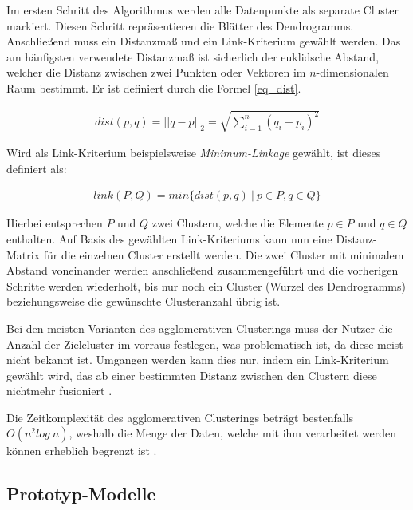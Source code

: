 Im ersten Schritt des Algorithmus werden alle Datenpunkte als separate Cluster markiert. Diesen Schritt
repräsentieren die Blätter des Dendrogramms.
Anschließend muss ein Distanzmaß und ein Link-Kriterium gewählt werden.
Das am häufigsten verwendete Distanzmaß ist sicherlich der euklidsche Abstand, welcher die Distanz zwischen zwei Punkten
oder Vektoren im $n$-dimensionalen Raum bestimmt. Er ist definiert durch die Formel \ref{eq_dist}.

\begin{ceqn}
\begin{align}
\label{eq_dist}
    dist(p,q) = ||q-p||_2 = \sqrt{\sum_{i=1}^n (q_i-p_i)^2}
\end{align}
\end{ceqn}

Wird als Link-Kriterium beispielsweise \textit{Minimum-Linkage} gewählt, ist dieses definiert als:

\begin{ceqn}
\begin{align}
\label{eq_linkage}
    link(P, Q) = min\{ dist(p,q)\ |\ p \in P, q \in Q\}
\end{align}
\end{ceqn}

Hierbei entsprechen $P$ und $Q$ zwei Clustern, welche die Elemente $p \in P$ und $q \in Q$ enthalten.
Auf Basis des gewählten Link-Kriteriums kann nun eine Distanz-Matrix für die einzelnen Cluster
erstellt werden.
Die zwei Cluster mit minimalem Abstand voneinander werden anschließend zusammengeführt und die
vorherigen Schritte werden wiederholt, bis nur noch ein Cluster (Wurzel des Dendrogramms) beziehungsweise
die gewünschte Clusteranzahl übrig ist. \cite[]{GeorgeSeif2018, tan2007introduction}

Bei den meisten Varianten des agglomerativen Clusterings muss der Nutzer die Anzahl der Zielcluster im
vorraus festlegen, was problematisch ist, da diese meist nicht bekannt ist. Umgangen werden kann dies nur,
indem ein Link-Kriterium gewählt wird, das ab einer bestimmten Distanz zwischen den Clustern diese nichtmehr
fusioniert \cite[]{GeorgeSeif2018}.

Die Zeitkomplexität des agglomerativen Clusterings beträgt bestenfalls $O(n^2log\ n)$, weshalb die Menge der Daten,
welche mit ihm verarbeitet werden können erheblich begrenzt ist \cite[]{tan2007introduction}.

\subsection{Prototyp-Modelle}
\label{sec:grund_prototype_clustering}

